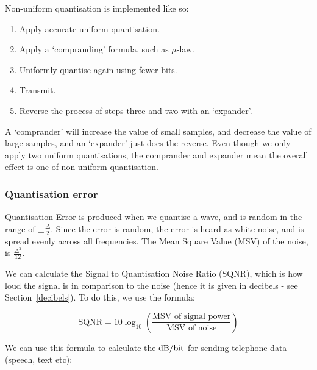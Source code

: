 \begin{description}
  Non-uniform quantisation is implemented like so:

  \begin{enumerate}
    \item Apply accurate uniform quantisation.
    \item Apply a `compranding' formula, such as $\mu$-law.
    \item Uniformly quantise again using fewer bits.
    \item Transmit.
    \item Reverse the process of steps three and two with an `expander'.
  \end{enumerate}


  A `comprander' will increase the value of small samples, and decrease the
  value of large samples, and an `expander' just does the reverse. Even though
  we only apply two uniform quantisations, the comprander and expander mean the
  overall effect is one of non-uniform quantisation.


\end{description}

\subsubsection{Quantisation error}

Quantisation Error is produced when we quantise a wave, and is random in the
range of $\pm\frac{\Delta}{2}$. Since the error is random, the error is heard as
white noise, and is spread evenly across all frequencies. The Mean Square Value
(MSV) of the noise, is $\frac{\Delta^2}{12}$.

We can calculate the Signal to Quantisation Noise Ratio (SQNR), which is how
loud the signal is in comparison to the noise (hence it is given in decibels -
see Section~\ref{decibels}). To do this, we use the formula:

\[
  \text{SQNR} = 10\log_{10}\left(\frac{\text{MSV of signal power}}{\text{MSV of noise}}\right)
\]

We can use this formula to calculate the $\si{\decibel\per\bit}$ for sending
telephone data (speech, text etc):

